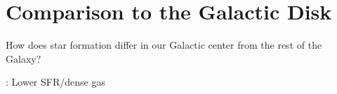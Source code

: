 \section{Comparison to the Galactic Disk}
How does star formation differ in our Galactic center from the rest of the Galaxy? 

\citet{Longmore2013b}: Lower SFR/dense gas

